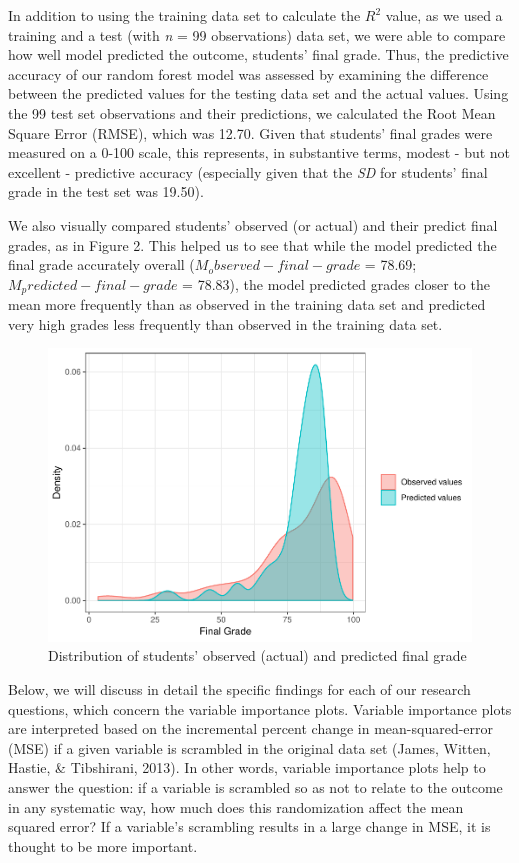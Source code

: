 \documentclass[acmart]{apa6}
\theoremstyle{definition}
\theoremstyle{definition}
\theoremstyle{definition}
\theoremstyle{remark}
\begin{document}
In addition to using the training data set to calculate the \(R^2\)
value, as we used a training and a test (with \emph{n} = 99
observations) data set, we were able to compare how well model predicted
the outcome, students' final grade. Thus, the predictive accuracy of our
random forest model was assessed by examining the difference between the
predicted values for the testing data set and the actual values. Using
the 99 test set observations and their predictions, we calculated the
Root Mean Square Error (RMSE), which was 12.70. Given that students'
final grades were measured on a 0-100 scale, this represents, in
substantive terms, modest - but not excellent - predictive accuracy
(especially given that the \emph{SD} for students' final grade in the
test set was 19.50).

We also visually compared students' observed (or actual) and their
predict final grades, as in Figure 2. This helped us to see that while
the model predicted the final grade accurately overall
(\(M_observed-final-grade\) = 78.69; \(M_predicted-final-grade\) =
78.83), the model predicted grades closer to the mean more frequently
than as observed in the training data set and predicted very high grades
less frequently than observed in the training data set.

\begin{figure}
\centering
\includegraphics{LAK_Manuscript_files/figure-latex/unnamed-chunk-3-1.pdf}
\caption{\label{fig:unnamed-chunk-3}Distribution of students' observed
(actual) and predicted final grade}
\end{figure}

Below, we will discuss in detail the specific findings for each of our
research questions, which concern the variable importance plots.
Variable importance plots are interpreted based on the incremental
percent change in mean-squared-error (MSE) if a given variable is
scrambled in the original data set (James, Witten, Hastie, \&
Tibshirani, 2013). In other words, variable importance plots help to
answer the question: if a variable is scrambled so as not to relate to
the outcome in any systematic way, how much does this randomization
affect the mean squared error? If a variable's scrambling results in a
large change in MSE, it is thought to be more important.
\end{document}
